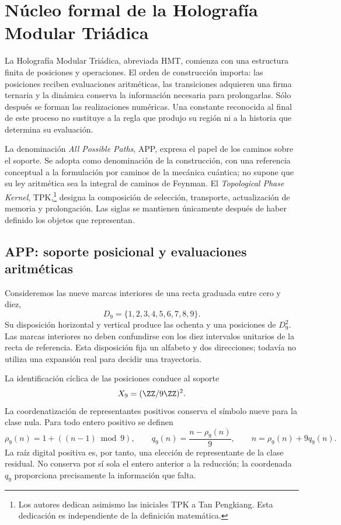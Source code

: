 \section{Núcleo formal de la Holografía Modular Triádica}
\label{sec:nucleo}

La Holografía Modular Triádica, abreviada HMT, comienza con una estructura finita de posiciones y operaciones. El orden de construcción importa: las posiciones reciben evaluaciones aritméticas, las transiciones adquieren una firma ternaria y la dinámica conserva la información necesaria para prolongarlas. Sólo después se forman las realizaciones numéricas. Una constante reconocida al final de este proceso no sustituye a la regla que produjo su región ni a la historia que determina su evaluación.

La denominación \emph{All Possible Paths}, APP, expresa el papel de los caminos sobre el soporte. Se adopta como denominación de la construcción, con una referencia conceptual a la formulación por caminos de la mecánica cuántica; no supone que su ley aritmética sea la integral de caminos de Feynman. El \emph{Topological Phase Kernel}, TPK,\footnote{Los autores dedican asimismo las iniciales TPK a Tan Pengkiang. Esta dedicación es independiente de la definición matemática.} designa la composición de selección, transporte, actualización de memoria y prolongación. Las siglas se mantienen únicamente después de haber definido los objetos que representan.

\subsection{APP: soporte posicional y evaluaciones aritméticas}

Consideremos las nueve marcas interiores de una recta graduada entre cero y diez,
\[
 D_9=\{1,2,3,4,5,6,7,8,9\}.
\]
Su disposición horizontal y vertical produce las ochenta y una posiciones de \(D_9^2\). Las marcas interiores no deben confundirse con los diez intervalos unitarios de la recta de referencia. Esta disposición fija un alfabeto y dos direcciones; todavía no utiliza una expansión real para decidir una trayectoria.

La identificación cíclica de las posiciones conduce al soporte
\[
 X_9=(\ZZ/9\ZZ)^2.
\]
La coordenatización de representantes positivos conserva el símbolo nueve para la clase nula. Para todo entero positivo se definen
\begin{equation}
 \rho_9(n)=1+((n-1)\bmod9),\qquad
 q_9(n)=\frac{n-\rho_9(n)}9,
 \qquad n=\rho_9(n)+9q_9(n).
 \label{eq:residuo-cociente}
\end{equation}
La raíz digital positiva es, por tanto, una elección de representante de la clase residual. No conserva por sí sola el entero anterior a la reducción; la coordenada \(q_9\) proporciona precisamente la información que falta.

